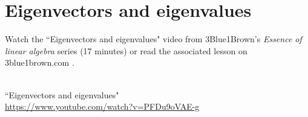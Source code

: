 \section{Eigenvectors and eigenvalues}

Watch the ``Eigenvectors and eigenvalues" video from 3Blue1Brown's
\textit{Essence of linear algebra} series (17 minutes) or read the associated
lesson on 3blue1brown.com
\cite{bib:3b1b_linalg_eigenvectors_and_eigenvalues}.
\begin{bookfigure}
   \\
  \tiny
  ``Eigenvectors and eigenvalues" \\
  \url{https://www.youtube.com/watch?v=PFDu9oVAE-g}
\end{bookfigure}
